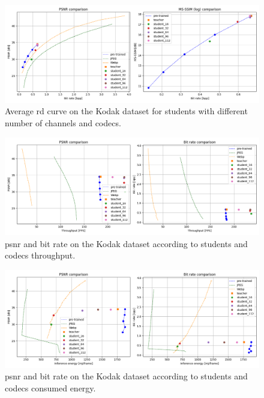 \documentclass{article}
\begin{document}
\begin{figure}
  \centering
  \includegraphics[width=15cm]{codecs_rd.png}
  \caption[Average \acrshort{rd} curve on the Kodak dataset for students with different number of channels and codecs.]{Average \acrshort{rd} curve on the Kodak dataset for students with different number of channels and codecs.}
  \label{appendix:codecs_rd}
\end{figure}

\begin{figure}
  \centering
  \includegraphics[width=15cm]{codecs_fps.png}
  \caption[\acrshort{psnr} and bit rate on the Kodak dataset according to students and codecs throughput.]{\acrshort{psnr} and bit rate on the Kodak dataset according to students and codecs throughput.}
  \label{appendix:codecs_fps}
\end{figure}

\begin{figure}
  \centering
  \includegraphics[width=15cm]{codecs_energy.png}
  \caption[\acrshort{psnr} and bit rate on the Kodak dataset according to students and codecs consumed energy.]{\acrshort{psnr} and bit rate on the Kodak dataset according to students and codecs consumed energy.}
  \label{appendix:codecs_energy}
\end{figure}
\end{document}
